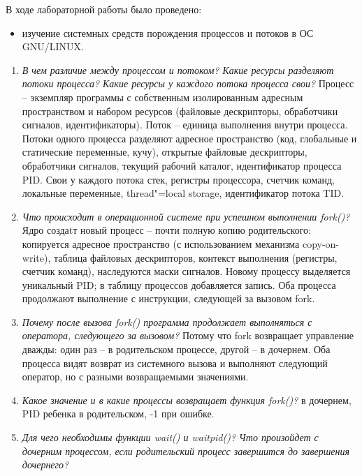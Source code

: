 
В ходе лабораторной работы было проведено: 
\begin{itemize}
	\item изучение системных средств порождения процессов и потоков в ОС GNU/LINUX.
\end{itemize}


\begin{enumerate}
	\item \textit{В чем различие между процессом и потоком? Какие ресурсы разделяют потоки процесса? Какие ресурсы у каждого потока процесса свои?}\newline 
	Процесс -- экземпляр программы с собственным изолированным адресным пространством и набором ресурсов (файловые дескрипторы, обработчики сигналов, идентификаторы). 
	Поток -- единица выполнения внутри процесса. 
	Потоки одного процесса разделяют адресное пространство (код, глобальные и статические переменные, кучу), открытые файловые дескрипторы, обработчики сигналов, текущий рабочий каталог, идентификатор процесса PID. 
	Свои у каждого потока стек, регистры процессора, счетчик команд, локальные переменные, thread"=local storage, идентификатор потока TID.
	\item \textit{Что происходит в операционной системе при успешном выполнении fork()?}\newline 
	Ядро создаtт новый процесс -- почти полную копию родительского: копируется адресное пространство (с использованием механизма copy-on-write), таблица файловых дескрипторов, контекст выполнения (регистры, счетчик команд), наследуются маски сигналов. 
	Новому процессу выделяется уникальный PID; в таблицу процессов добавляется запись. 
	Оба процесса продолжают выполнение с инструкции, следующей за вызовом fork.
	\item \textit{Почему после вызова fork() программа продолжает выполняться с оператора, следующего за вызовом?}\newline 
	Потому что fork возвращает управление дважды: один раз -- в родительском процессе, другой -- в дочернем. 
	Оба процесса видят возврат из системного вызова и выполняют следующий оператор, но с разными возвращаемыми значениями.
	\item \textit{Какое значение и в какие процессы возвращает функция fork()?} в дочернем, PID ребенка в родительском, -1 при ошибке.
	\item \textit{Для чего необходимы функции wait() и waitpid()? Что произойдет с дочерним процессом, если родительский процесс завершится до завершения дочернего?}\newline 

\end{enumerate}
